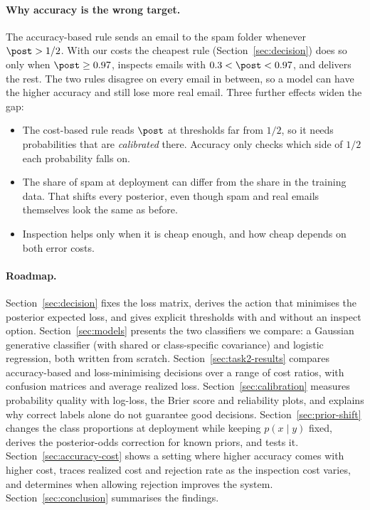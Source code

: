 \paragraph{Why accuracy is the wrong target.}
The accuracy-based rule sends an email to the spam folder whenever $\post>1/2$. With our costs the
cheapest rule (Section~\ref{sec:decision}) does so only when $\post\ge0.97$, inspects emails with
$0.3<\post<0.97$, and delivers the rest. The two rules disagree on every email in between, so a model can
have the higher accuracy and still lose more real email. Three further effects widen the gap:
\begin{itemize}[itemsep=1pt,topsep=2pt]
  \item The cost-based rule reads $\post$ at thresholds far from $1/2$, so it needs probabilities that
        are \emph{calibrated} there. Accuracy only checks which side of $1/2$ each probability falls on.
  \item The share of spam at deployment can differ from the share in the training data. That shifts every
        posterior, even though spam and real emails themselves look the same as before.
  \item Inspection helps only when it is cheap enough, and how cheap depends on both error costs.
\end{itemize}

\paragraph{Roadmap.}
Section~\ref{sec:decision} fixes the loss matrix, derives the action that minimises the posterior
expected loss, and gives explicit thresholds with and without an inspect option.
Section~\ref{sec:models} presents the two classifiers we compare: a Gaussian generative classifier
(with shared or class-specific covariance) and logistic regression, both written from scratch.
Section~\ref{sec:task2-results} compares accuracy-based and loss-minimising decisions over a range of cost
ratios, with confusion matrices and average realized loss.
Section~\ref{sec:calibration} measures probability quality with log-loss, the Brier score and
reliability plots, and explains why correct labels alone do not guarantee good decisions.
Section~\ref{sec:prior-shift} changes the class proportions at deployment while keeping $p(x\mid y)$
fixed, derives the posterior-odds correction for known priors, and tests it.
Section~\ref{sec:accuracy-cost} shows a setting where higher accuracy comes with higher cost, traces
realized cost and rejection rate as the inspection cost varies, and determines when allowing rejection
improves the system. Section~\ref{sec:conclusion} summarises the findings.


